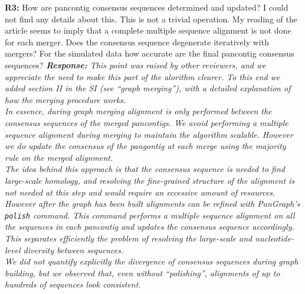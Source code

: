 \documentclass[aps,rmp,onecolumn]{revtex4-1}
\newcommand{\Marco}[1]{{\color{orange}Marco: #1}}
\newcommand{\Liam}[1]{{\color{teal}Liam: #1}}
\newcommand{\reviewer}[2]{\textbf{#1:} #2\vskip 5mm}
\newcommand{\response}[1]{{\it {\color{response}\textbf{Response:} #1}}\vskip 5mm}
\newcommand{\SIalgo}{II}
\begin{document}
\reviewer{R3}{How are pancontig consensus sequences determined and updated? I could not find any details about this. This is not a trivial operation. My reading of the article seems to imply that a complete multiple sequence alignment is not done for each merger. Does the consensus sequence degenerate iteratively with mergers? For the simulated data how accurate are the final pancontig consensus sequences?}
\response{This point was raised by other reviewers, and we appreciate the need to make this part of the alorithm clearer. To this end we added section {\SIalgo} in the SI (see ``graph merging''), with a detailed explanation of how the merging procedure works.\\
      In essence, during graph merging alignment is only performed between the consensus sequences of the merged pancontigs. We avoid performing a multiple sequence alignment during merging to maintain the algorithm scalable. However we do update the consensus of the pangontig at each merge using the majority rule on the merged alignment.\\
      The idea behind this approach is that the consensus sequence is needed to find large-scale homology, and resolving the fine-grained structure of the alignment is not needed at this step and would require an eccessive amount of resources. However after the graph has been built alignments can be refined with \textit{PanGraph}'s \texttt{polish} command. This command performs a multiple sequence alignment on all the sequences in each pancontig and updates the consensus sequence accordingly. This separates efficiently the problem of resolving the large-scale and nucleotide-level diversity between sequences.\\
      We did not quantify explicitly the divergence of consensus sequences during graph building, but we observed that, even without ``polishing'', alignments of up to hundreds of sequences look consistent.
}
\end{document}
